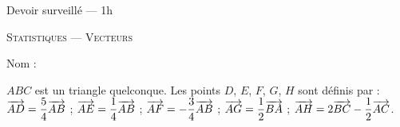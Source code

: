 \documentclass[12pt]{article}
\begin{document}
\begin{center}
  {\large
    Devoir surveillé --- 1h

    \textsc{Statistiques --- Vecteurs}
  }

  Nom : \hfill ~
\end{center}

\begin{exercice}
  $ABC$ est un triangle quelconque. Les points $D$, $E$, $F$, $G$, $H$ sont définis par :
  $\overrightarrow{AD}= \dfrac{5}{4}\overrightarrow{AB}$ ;
  $\overrightarrow{AE}= \dfrac{1}{4}\overrightarrow{AB}$ ;
  $\overrightarrow{AF}=-\dfrac{3}{4}\overrightarrow{AB}$ ;
  $\overrightarrow{AG}= \dfrac{1}{2}\overrightarrow{BA}$ ;
  $\overrightarrow{AH}= 2\overrightarrow{BC} - \dfrac{1}{2}\overrightarrow{AC}$.

  \begin{center}
  \end{center}


\end{exercice}
\end{document}
